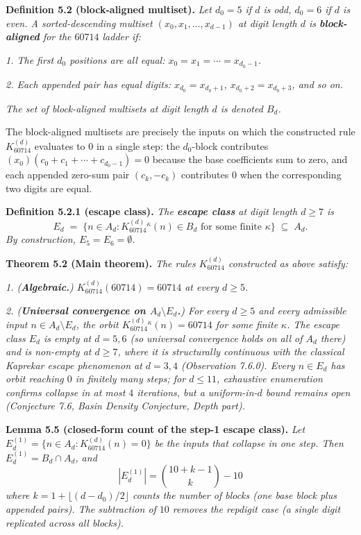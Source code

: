 \documentclass[11pt,letterpaper]{article}
\theoremstyle{paperstyle}
\theoremstyle{paperstyledef}
\theoremstyle{paperstylerem}
\begin{document}
\textbf{Definition 5.2 (block-aligned multiset).} \emph{Let \(d_0 = 5\)
if \(d\) is odd, \(d_0 = 6\) if \(d\) is even. A sorted-descending
multiset \((x_0, x_1, \ldots, x_{d-1})\) at digit length \(d\) is
\textbf{block-aligned} for the \(60714\) ladder if:}

\emph{1. The first \(d_0\) positions are all equal:
\(x_0 = x_1 = \cdots = x_{d_0 - 1}\).}

\emph{2. Each appended pair has equal digits: \(x_{d_0} = x_{d_0+1}\),
\(x_{d_0+2} = x_{d_0+3}\), and so on.}

\emph{The set of block-aligned multisets at digit length \(d\) is
denoted \(B_d\).}

The block-aligned multisets are precisely the inputs on which the
constructed rule \(K_{60714}^{(d)}\) evaluates to \(0\) in a single
step: the \(d_0\)-block contributes
\((x_0)(c_0 + c_1 + \cdots + c_{d_0 - 1}) = 0\) because the base
coefficients sum to zero, and each appended zero-sum pair
\((c_k, -c_k)\) contributes \(0\) when the corresponding two digits are
equal.

\textbf{Definition 5.2.1 (escape class).} \emph{The \textbf{escape
class} at digit length \(d \geq 7\) is}
\[E_d \;=\; \{n \in A_d : K_{60714}^{(d)}{}^{\kappa}(n) \in B_d \text{ for some finite } \kappa\} \;\subseteq\; A_d.\]
\emph{By construction, \(E_5 = E_6 = \emptyset\).}

\textbf{Theorem 5.2 (Main theorem).} \emph{The rules \(K_{60714}^{(d)}\)
constructed as above satisfy:}

\emph{1. (\textbf{Algebraic.}) \(K_{60714}^{(d)}(60714) = 60714\) at
every \(d \geq 5\).}

\emph{2. (\textbf{Universal convergence on \(A_d \setminus E_d\).}) For
every \(d \geq 5\) and every admissible input
\(n \in A_d \setminus E_d\), the orbit
\(K_{60714}^{(d)}{}^{\kappa}(n) = 60714\) for some finite \(\kappa\).
The escape class \(E_d\) is empty at \(d = 5, 6\) (so universal
convergence holds on all of \(A_d\) there) and is non-empty at
\(d \geq 7\), where it is structurally continuous with the classical
Kaprekar escape phenomenon at \(d = 3, 4\) (Observation 7.6.0). Every
\(n \in E_d\) has orbit reaching \(0\) in finitely many steps; for
\(d \leq 11\), exhaustive enumeration confirms collapse in at most \(4\)
iterations, but a uniform-in-\(d\) bound remains open (Conjecture 7.6,
Basin Density Conjecture, Depth part).}

\textbf{Lemma 5.5 (closed-form count of the step-1 escape class).}
\emph{Let \(E_d^{(1)} = \{n \in A_d : K_{60714}^{(d)}(n) = 0\}\) be the
inputs that collapse in one step. Then \(E_d^{(1)} = B_d \cap A_d\),
and} \[|E_d^{(1)}| = \binom{10 + k - 1}{k} - 10\] \emph{where
\(k = 1 + \lfloor (d - d_0)/2 \rfloor\) counts the number of blocks (one
base block plus appended pairs). The subtraction of \(10\) removes the
repdigit case (a single digit replicated across all blocks).}
\end{document}
